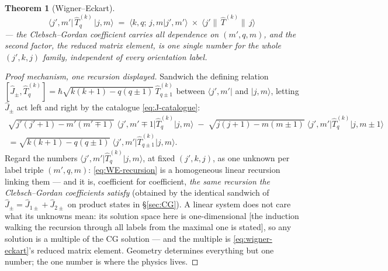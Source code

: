 \documentclass[11pt]{article}
\theoremstyle{plain}
\newtheorem{theorem}{Theorem}[section]
\theoremstyle{definition}
\theoremstyle{remark}
\newcommand{\op}[1]{\hat{#1}}
\newcommand{\ket}[1]{\lvert #1 \rangle}
\newcommand{\bra}[1]{\langle #1 \rvert}
\newcommand{\braket}[2]{\langle #1 | #2 \rangle}
\begin{document}
\begin{theorem}[Wigner--Eckart]\label{thm:wigner-eckart}
\begin{equation}
  \boxed{\;
  \bra{j', m'}\,\op T^{(k)}_q\,\ket{j, m}
  \;=\;
  \braket{k, q;\, j, m}{j', m'}
  \;\times\;
  \langle j' \|\, \op T^{(k)} \|\, j\rangle
  \;}
  \label{eq:wigner-eckart}
\end{equation}
--- the Clebsch--Gordan coefficient carries \emph{all} dependence
on $(m', q, m)$, and the second factor, the \emph{reduced matrix
element}, is one single number for the whole
$(j', k, j)$ family, independent of every orientation label.
\end{theorem}

\begin{proof}[Proof mechanism, one recursion displayed]
Sandwich the defining relation
$[\op J_\pm, \op T^{(k)}_q] = \hbar\sqrt{k(k+1) - q(q\pm1)}\,
\op T^{(k)}_{q\pm1}$ between $\bra{j', m'}$ and $\ket{j, m}$,
letting $\op J_\pm$ act left and right by the catalogue
\eqref{eq:J-catalogue}:
\begin{multline}
  \sqrt{j'(j'{+}1) - m'(m'{\mp}1)}\;
  \bra{j', m'{\mp}1}\op T^{(k)}_q\ket{j, m}
  \;-\;
  \sqrt{j(j{+}1) - m(m{\pm}1)}\;
  \bra{j', m'}\op T^{(k)}_q\ket{j, m{\pm}1}
  \\
  = \sqrt{k(k{+}1) - q(q{\pm}1)}\;
  \bra{j', m'}\op T^{(k)}_{q\pm1}\ket{j, m}.
  \label{eq:WE-recursion}
\end{multline}
Regard the numbers $\bra{j', m'}\op T^{(k)}_q\ket{j, m}$, at fixed
$(j', k, j)$, as one unknown per label triple $(m', q, m)$:
\eqref{eq:WE-recursion} is a homogeneous linear recursion linking
them --- and it is, coefficient for coefficient, \emph{the same
recursion the Clebsch--Gordan coefficients satisfy} (obtained by
the identical sandwich of $\op J_\pm = \op J_{1\pm} + \op J_{2\pm}$
on product states in \S\ref{sec:CG}). A linear system does not care
what its unknowns mean: its solution space here is
one-dimensional [the induction walking the recursion through all
labels from the maximal one is stated], so any solution is a
multiple of the CG solution --- and the multiple is
\eqref{eq:wigner-eckart}'s reduced matrix element. Geometry
determines everything but one number; the one number is where the
physics lives.
\end{proof}
\end{document}
